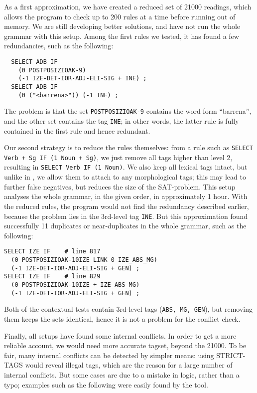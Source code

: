 {{As a first approximation, we have created a reduced set of 21000 readings, which allows the program to check up to 200 
rules at a time before running out of memory. We are still developing better solutions, and have not run the whole grammar with this setup.
Among the first rules we tested, it has found a few redundancies, such as the following:

\begin{verbatim}
  SELECT ADB IF
    (0 POSTPOSIZIOAK-9) 
    (-1 IZE-DET-IOR-ADJ-ELI-SIG + INE) ;
  SELECT ADB IF  
    (0 ("<barrena>")) (-1 INE) ;
\end{verbatim}

\noindent The problem is that the set \texttt{POSTPOSIZIOAK-9} contains the word form ``barrena'', and the other set contains the tag \texttt{INE}; in other words, the latter rule is fully contained in the first rule and hence redundant.


Our second strategy is to reduce the rules themselves: from a rule such as \texttt{SELECT Verb + Sg IF (1 Noun + Sg)},
we just remove all tags higher than level 2, resulting in
\texttt{SELECT Verb IF (1 Noun)}. We also keep all lexical tags
intact, but unlike in \cite{listenmaa_claessen2016}, we allow them to attach to any morphological tags; this may
lead to further false negatives, but reduces the size of the SAT-problem.
This setup analyses the whole grammar, in the given order, in approximately 1 hour. 
With the reduced rules, the program would not find the redundancy described earlier, because
the problem lies in the 3rd-level tag \texttt{INE}. But this approximation found successfully 11 duplicates or near-duplicates in the whole grammar, such as the following:

\begin{verbatim}
SELECT IZE IF 	 # line 817
  (0 POSTPOSIZIOAK-10IZE LINK 0 IZE_ABS_MG) 
  (-1 IZE-DET-IOR-ADJ-ELI-SIG + GEN) ; 
SELECT IZE IF 	 # line 829
  (0 POSTPOSIZIOAK-10IZE + IZE_ABS_MG) 
  (-1 IZE-DET-IOR-ADJ-ELI-SIG + GEN) ;
\end{verbatim}

\noindent Both of the contextual tests contain 3rd-level tags (\texttt{ABS, MG, GEN}), but removing them keeps the sets identical, hence it is not a problem for the conflict check.



Finally, all setups have found some internal conflicts. In order to get a more reliable account, we would need 
more accurate tagset, beyond the 21000. To be fair, many internal conflicts can be detected by simpler means:
using STRICT-TAGS would reveal illegal tags, which are the reason for a large number of internal conflicts. 
But some cases are due to a mistake in logic, rather than a typo; examples such as the following were easily found by the tool. %

}}

